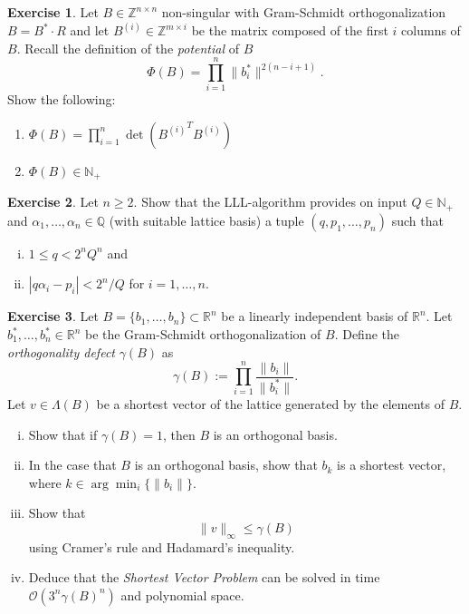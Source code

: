 \documentclass[12pt,a4paper]{article}
\theoremstyle{plain}
\newtheorem*{Sol*}{Solution}
\theoremstyle{definition}
\newtheorem{Ex}{Exercise}
\def \R {\mathbb R}
\newif\ifsolutions
\newcommand{\exercise}[2]{
			\begin{Ex} #1 \end{Ex}
			\ifsolutions  \begin{Sol*} #2 \end{Sol*} \bigskip \else \bigskip  \fi
		}
\begin{document}
  \exercise{
    Let $B ∈ℤ^{n×n}$ non-singular with Gram-Schmidt orthogonalization $B = B^*⋅ R$ and let $B^{(i)} ∈ℤ^{m ×i}$ be the matrix composed of the first $i$ columns of $B$.  Recall the definition of the \emph{potential} of $B$
    \begin{displaymath}
      Φ(B) = ∏_{i=1}^n \|b_i^*\|^{2(n-i+1)}.
    \end{displaymath}
    Show the following:
    \begin{enumerate}
    \item $ Φ(B) = ∏_{i=1}^n \det\left({B^{(i)}}^T B^{(i)}\right)$
    \item $ Φ(B) ∈ ℕ_+$  
    \end{enumerate}
  }{}


  \exercise{Let $n≥2$. 
    Show that the LLL-algorithm provides on input $Q ∈ℕ_+$ and $α_1,\dots,α_n ∈ℚ$ (with suitable lattice basis)  a tuple $(q,p_1,\dots,p_n)$ such that
      \begin{enumerate}[i)] 
      \item $1 ≤ q < 2^n Q^n$ and
      \item $| q α_i - p_i | < 2^n/Q$ for $i=1,\dots,n$. 
      \end{enumerate}

    }{}
  
\exercise{
	Let $B = \{b_1,\dots,b_n\} \subset \R^n$ be a linearly independent basis of $\R^n$. 
	Let $b_1^*,\dots,b_n^* ∈ ℝ^n$ be the Gram-Schmidt orthogonalization of $B$.
	Define the \emph{orthogonality defect} $\gamma(B)$ as
		\[ \gamma(B) := \prod_{i=1}^n \frac{\| b_i \|}{\| b_i^* \|}. \]
	Let $v \in \Lambda(B)$ be a shortest vector of the lattice generated by the elements of $B$.
	\begin{enumerate}[i)]
		\item Show that if $\gamma(B)=1$, then $B$ is an orthogonal basis.
		\item In the case that  $B$ is an orthogonal basis, show that $b_k$ is a shortest vector, where $k \in \arg\min_i \{ \| b_i \| \}$.
		\item Show that
			\[ \| v \|_\infty \leq \gamma(B) \]
		using Cramer's rule and Hadamard's inequality.
		\item Deduce that the \emph{Shortest Vector Problem} can be solved in time $\mathcal{O}\left(3^n\gamma(B)^n\right)$ and polynomial space.
		
	\end{enumerate}
}
{}
\end{document}
